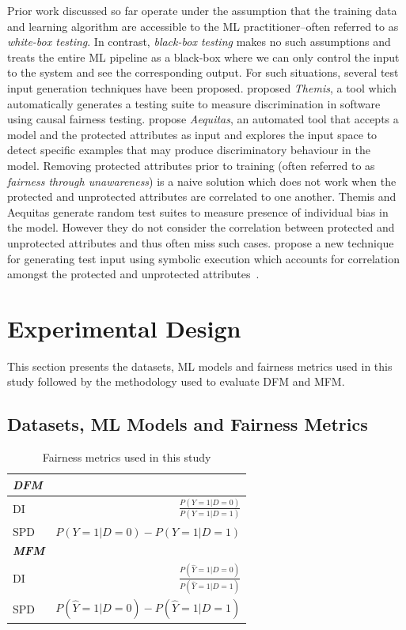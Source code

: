 \documentclass{article}
\begin{document}
Prior work discussed so far operate under the assumption that the
training data and learning algorithm are accessible to the ML
practitioner--often referred to as \emph{white-box testing}. In
contrast, \emph{black-box testing} makes no such assumptions and
treats the entire ML pipeline as a black-box where we can only control
the input to the system and see the corresponding output. For such
situations, several test input generation techniques have been
proposed. \citeauthor{galhotra2017fairness} proposed \emph{Themis},
a tool which automatically generates a testing suite to measure
discrimination in software using causal fairness
testing. \citeauthor{udeshi2018automated} propose \emph{Aequitas}, an
automated tool that accepts a model and the protected attributes as
input and explores the input space to detect specific examples that
may produce discriminatory behaviour in the model. Removing protected
attributes prior to training (often referred to as \emph{fairness
through unawareness}) is a naive solution which does not work when the
protected and unprotected attributes are correlated to one
another. Themis and Aequitas generate random test suites to measure
presence of individual bias in the model. However they do not consider
the correlation between protected and unprotected attributes and thus
often miss such cases. \citeauthor{aggarwal2019black} propose a new
technique for generating test input using symbolic execution which
accounts for correlation amongst the protected and unprotected
attributes \cite{aggarwal2019black,udeshi2018automated,galhotra2017fairness}.

\section{Experimental Design}\label{sec:method}

This section presents the datasets, ML models and fairness metrics
used in this study followed by the methodology used to evaluate DFM
and MFM.

\subsection{Datasets, ML Models and Fairness Metrics}\label{sec:method-parameters}

\begin{table}
  \centering
  \begin{tabular}{l r}
    \toprule
    \textbf{\emph{DFM}}\\
    \midrule
    DI & \(\displaystyle \frac{P(Y=1|D=0)}{P(Y=1|D=1)}\)\\
    SPD & \(\displaystyle P(Y=1|D=0)-P(Y=1|D=1)\)\\
    \midrule
    \textbf{\emph{MFM}}\\
    \midrule
    DI & \(\displaystyle \frac{P(\hat{Y}=1|D=0)}{P(\hat{Y}=1|D=1)}\)\\
    SPD & \(\displaystyle P(\hat{Y}=1|D=0)-P(\hat{Y}=1|D=1)\)\\
    \bottomrule
  \end{tabular}
  \caption{Fairness metrics used in this study}
  \label{tab:fairness-metrics}
\end{table}
\end{document}
